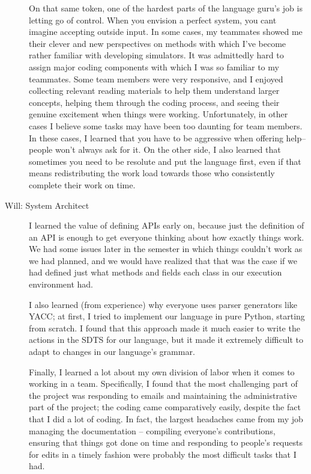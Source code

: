 \begin{description}
  On that same token, one of the hardest parts of the language guru's
  job is letting go of control. When you envision a perfect system,
  you cant imagine accepting outside input. In some cases, my
  teammates showed me their clever and new perspectives on methods
  with which I've become rather familiar with developing
  simulators. It was admittedly hard to assign major coding components
  with which I was so familiar to my teammates. Some team members were
  very responsive, and I enjoyed collecting relevant reading materials
  to help them understand larger concepts, helping them through the
  coding process, and seeing their genuine excitement when things were
  working. Unfortunately, in other cases I believe some tasks may have
  been too daunting for team members. In these cases, I learned that
  you have to be aggressive when offering help--people won't always
  ask for it. On the other side, I also learned that sometimes you
  need to be resolute and put the language first, even if that means
  redistributing the work load towards those who consistently complete
  their work on time.

\item[Will: System Architect] I learned the value of defining APIs
  early on, because just the definition of an API is enough to get
  everyone thinking about how exactly things work. We had some issues
  later in the semester in which things couldn't work as we had
  planned, and we would have realized that that was the case if we had
  defined just what methods and fields each class in our execution
  environment had.

  I also learned (from experience) why everyone uses parser generators
  like YACC; at first, I tried to implement our language in pure
  Python, starting from scratch. I found that this approach made it
  much easier to write the actions in the SDTS for our language, but
  it made it extremely difficult to adapt to changes in our language's
  grammar.

  Finally, I learned a lot about my own division of labor when it
  comes to working in a team. Specifically, I found that the most
  challenging part of the project was responding to emails and
  maintaining the administrative part of the project; the coding came
  comparatively easily, despite the fact that I did a lot of
  coding. In fact, the largest headaches came from my job managing the
  documentation -- compiling everyone's contributions, ensuring that
  things got done on time and responding to people's requests for
  edits in a timely fashion were probably the most difficult tasks
  that I had.


\end{description}

